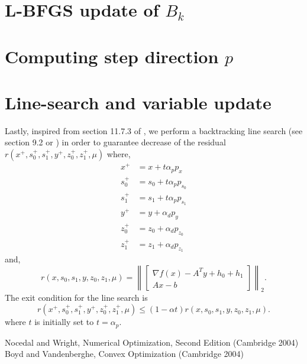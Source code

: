 \documentclass{article}
\begin{document}
\section{L-BFGS update of $B_k$}
\section{Computing step direction $p$}
\section{Line-search and variable update}
    
Lastly, inspired from section 11.7.3 of \cite{BL04}, 
    we perform a backtracking line search (see section 9.2 or \cite{BL04})
    in order to guarantee decrease of the residual
    $r(x^+, s_0^+, s_1^+, y^+, z_0^+, z_1^+, \mu)$ where,
    \begin{subequations}\begin{align}
    x^+ &= x + t \alpha_p p_x \\
    s_0^+ &= s_0+t \alpha_p p_{s_0} \\
    s_1^+ &= s_1+t \alpha_p p_{s_1} \\
    y^+ &= y +\alpha_d p_y \\
    z_0^+ &= z_0 + \alpha_d p_{z_0} \\
    z_1^+ &= z_1+\alpha_d p_{z_1} 
    \end{align}\end{subequations}
    and,
\begin{equation}
    r(x, s_0, s_1, y, z_0, z_1, \mu) = 
\left\|
\begin{bmatrix}
    \nabla f(x) - A^T y + h_0 + h_1 \\ A x - b
\end{bmatrix}\right\|_2.
\end{equation}
The exit condition for the line search is 
    \begin{equation} r(x^+, s_0^+, s_1^+, y^+, z_0^+, z_1^+, \mu) \le
    (1-\alpha t) r(x, s_0, s_1, y, z_0, z_1, \mu).
    \end{equation}
where $t$ is initially set to $t = \alpha_p$.


\begin{thebibliography}{99}
 Nocedal and Wright, 
    Numerical Optimization, Second Edition (Cambridge 2004)
 Boyd and Vandenberghe,
    Convex Optimization (Cambridge 2004)
\end{thebibliography}
\end{document}
